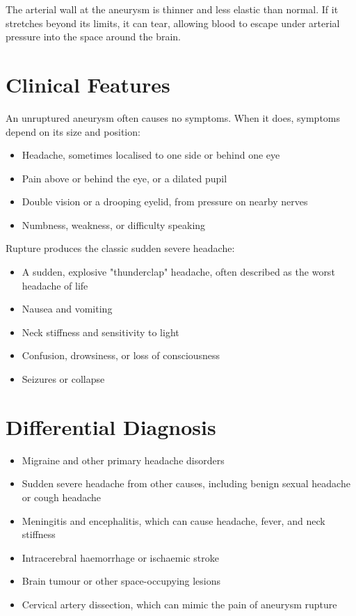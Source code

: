 The arterial wall at the aneurysm is thinner and less elastic than normal. If it stretches beyond its limits, it can tear, allowing blood to escape under arterial pressure into the space around the brain.

\section*{Clinical Features}
An unruptured aneurysm often causes no symptoms. When it does, symptoms depend on its size and position:

\begin{itemize}
    \item Headache, sometimes localised to one side or behind one eye
    \item Pain above or behind the eye, or a dilated pupil
    \item Double vision or a drooping eyelid, from pressure on nearby nerves
    \item Numbness, weakness, or difficulty speaking
\end{itemize}

Rupture produces the classic sudden severe headache:

\begin{itemize}
    \item A sudden, explosive "thunderclap" headache, often described as the worst headache of life
    \item Nausea and vomiting
    \item Neck stiffness and sensitivity to light
    \item Confusion, drowsiness, or loss of consciousness
    \item Seizures or collapse
\end{itemize}

\section*{Differential Diagnosis}
\begin{itemize}
    \item Migraine and other primary headache disorders
    \item Sudden severe headache from other causes, including benign sexual headache or cough headache
    \item Meningitis and encephalitis, which can cause headache, fever, and neck stiffness
    \item Intracerebral haemorrhage or ischaemic stroke
    \item Brain tumour or other space-occupying lesions
    \item Cervical artery dissection, which can mimic the pain of aneurysm rupture
\end{itemize}

